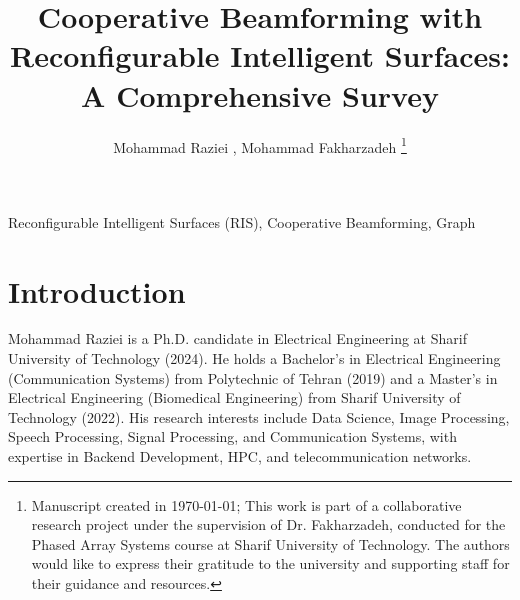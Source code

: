 \documentclass[lettersize,journal]{IEEEtran}
\title{Cooperative Beamforming with Reconfigurable Intelligent Surfaces: A Comprehensive Survey}
\author{Mohammad Raziei
	\orcidlink{0009-0007-3346-9365},
	Mohammad Fakharzadeh
	\thanks{Manuscript created in \today; 
		This work is part of a collaborative research project under the supervision of Dr. Fakharzadeh, conducted for the Phased Array Systems course at Sharif University of Technology. The authors would like to express their gratitude to the university and supporting staff for their guidance and resources.}
}
\begin{document}
\maketitle

\begin{abstract}

\end{abstract}

\begin{IEEEkeywords}
Reconfigurable Intelligent Surfaces (RIS), Cooperative Beamforming, Graph
\end{IEEEkeywords}


\section{Introduction}






































\nocite{*}




\begin{IEEEbiography} {Mohammad Raziei is a Ph.D. candidate in Electrical Engineering at Sharif University of Technology (2024). He holds a Bachelor's in Electrical Engineering (Communication Systems) from Polytechnic of Tehran (2019) and a Master's in Electrical Engineering (Biomedical Engineering) from Sharif University of Technology (2022). His research interests include Data Science, Image Processing, Speech Processing, Signal Processing, and Communication Systems, with expertise in Backend Development, HPC, and telecommunication networks.}
\end{IEEEbiography}
\end{document}
